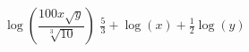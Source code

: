 {$\log\left(\dfrac{100x\sqrt{y}}{\sqrt[3]{10}}\right)$ }
{$\frac{5}{3}+\log(x)+\frac{1}{2}\log(y)$}

